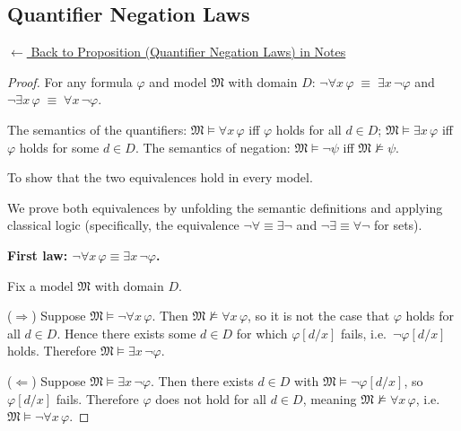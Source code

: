 
\subsection*{Quantifier Negation Laws}
\label{prf:qneg}

\begin{remark*}[Return]
\hyperref[thm:qneg]{$\leftarrow$ Back to Proposition (Quantifier Negation Laws) in Notes}
\end{remark*}

\begin{proof}
\Claim For any formula $\varphi$ and model $\mathfrak{M}$ with domain $D$: $\neg \forall x\,\varphi \;\equiv\; \exists x\,\neg \varphi$ and $\neg \exists x\,\varphi \;\equiv\; \forall x\,\neg \varphi$.

\Given The semantics of the quantifiers: $\mathfrak{M} \models \forall x\,\varphi$
iff $\varphi$ holds for all $d \in D$; $\mathfrak{M} \models \exists x\,\varphi$
iff $\varphi$ holds for some $d \in D$. The semantics of negation:
$\mathfrak{M} \models \neg\psi$ iff $\mathfrak{M} \not\models \psi$.

\Goal To show that the two equivalences hold in every model.

\Strategy We prove both equivalences by unfolding the semantic definitions and
applying classical logic (specifically, the equivalence $\neg\forall \equiv
\exists\neg$ and $\neg\exists \equiv \forall\neg$ for sets).

\medskip
\noindent\textbf{First law: $\neg\forall x\,\varphi \equiv \exists x\,\neg\varphi$.}

Fix a model $\mathfrak{M}$ with domain $D$.

($\Rightarrow$) Suppose $\mathfrak{M} \models \neg\forall x\,\varphi$. Then
$\mathfrak{M} \not\models \forall x\,\varphi$, so it is not the case that
$\varphi$ holds for all $d \in D$. Hence there exists some $d \in D$ for which
$\varphi[d/x]$ fails, i.e.\ $\neg\varphi[d/x]$ holds. Therefore $\mathfrak{M}
\models \exists x\,\neg\varphi$.

($\Leftarrow$) Suppose $\mathfrak{M} \models \exists x\,\neg\varphi$. Then
there exists $d \in D$ with $\mathfrak{M} \models \neg\varphi[d/x]$, so
$\varphi[d/x]$ fails. Therefore $\varphi$ does not hold for all $d \in D$,
meaning $\mathfrak{M} \not\models \forall x\,\varphi$, i.e.\ $\mathfrak{M}
\models \neg\forall x\,\varphi$.


\end{proof}
